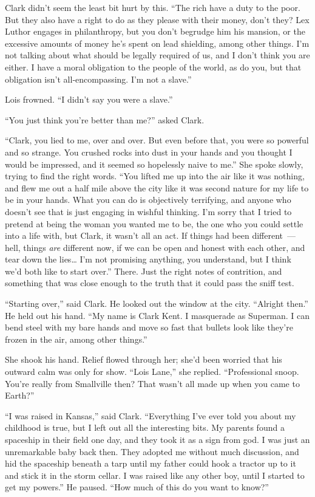 \documentclass[ebook,12pt]{memoir}
\begin{document}
Clark didn't seem the least bit hurt by this. ``The rich have a duty to
the poor. But they also have a right to do as they please with their
money, don't they? Lex Luthor engages in philanthropy, but you don't
begrudge him his mansion, or the excessive amounts of money he's spent
on lead shielding, among other things. I'm not talking about what should
be legally required of us, and I don't think you are either. I have a
moral obligation to the people of the world, as do you, but that
obligation isn't all‐encompassing. I'm not a slave.''

Lois frowned. ``I didn't say you were a slave.''

``You just think you're better than me?'' asked Clark.

``Clark, you lied to me, over and over. But even before that, you were
so powerful and so strange. You crushed rocks into dust in your hands
and you thought I would be impressed, and it seemed so hopelessly naive
to me.'' She spoke slowly, trying to find the right words. ``You lifted
me up into the air like it was nothing, and flew me out a half mile
above the city like it was second nature for my life to be in your
hands. What you can do is objectively terrifying, and anyone who doesn't
see that is just engaging in wishful thinking. I'm sorry that I tried to
pretend at being the woman you wanted me to be, the one who you could
settle into a life with, but Clark, it wasn't all an act. If things had
been different~--- hell, things \emph{are} different now, if we can be
open and honest with each other, and tear down the lies\ldots{} I'm not
promising anything, you understand, but I think we'd both like to start
over.'' There. Just the right notes of contrition, and something that
was close enough to the truth that it could pass the sniff test.

``Starting over,'' said Clark. He looked out the window at the city.
``Alright then.'' He held out his hand. ``My name is Clark Kent. I
masquerade as Superman. I can bend steel with my bare hands and move so
fast that bullets look like they're frozen in the air, among other
things.''

She shook his hand. Relief flowed through her; she'd been worried that
his outward calm was only for show. ``Lois Lane,'' she replied.
``Professional snoop. You're really from Smallville then? That wasn't
all made up when you came to Earth?''

``I was raised in Kansas,'' said Clark. ``Everything I've ever told you
about my childhood is true, but I left out all the interesting bits. My
parents found a spaceship in their field one day, and they took it as a
sign from god. I was just an unremarkable baby back then. They adopted
me without much discussion, and hid the spaceship beneath a tarp until
my father could hook a tractor up to it and stick it in the storm
cellar. I was raised like any other boy, until I started to get my
powers.'' He paused. ``How much of this do you want to know?''
\end{document}
